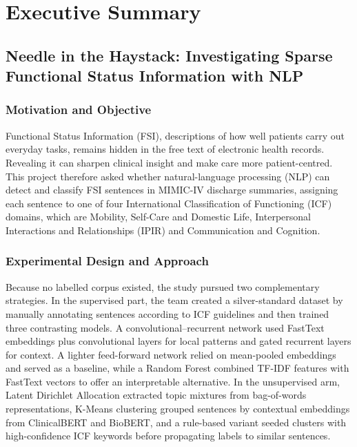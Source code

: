 \chapter{Executive Summary}
\section{Needle in the Haystack: Investigating Sparse Functional Status Information with NLP}
\subsection{Motivation and Objective}

Functional Status Information (FSI), descriptions of how well patients carry out everyday tasks, remains hidden in the free text of electronic health records. Revealing it can sharpen clinical insight and make care more patient-centred. This project therefore asked whether natural-language processing (NLP) can detect and classify FSI sentences in MIMIC-IV discharge summaries, assigning each sentence to one of four International Classification of Functioning (ICF) domains, which are Mobility, Self-Care and Domestic Life, Interpersonal Interactions and Relationships (IPIR) and Communication and Cognition. \medskip

\subsection{Experimental Design and Approach}

Because no labelled corpus existed, the study pursued two complementary strategies. In the supervised part, the team created a silver-standard dataset by manually annotating sentences according to ICF guidelines and then trained three contrasting models. A convolutional–recurrent network used FastText embeddings plus convolutional layers for local patterns and gated recurrent layers for context. A lighter feed-forward network relied on mean-pooled embeddings and served as a baseline, while a Random Forest combined TF-IDF features with FastText vectors to offer an interpretable alternative. In the unsupervised arm, Latent Dirichlet Allocation extracted topic mixtures from bag-of-words representations, K-Means clustering grouped sentences by contextual embeddings from ClinicalBERT and BioBERT, and a rule-based variant seeded clusters with high-confidence ICF keywords before propagating labels to similar sentences. \medskip

